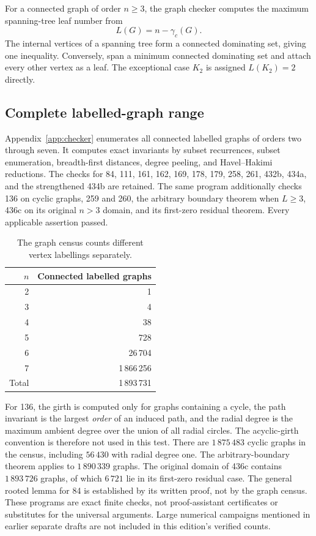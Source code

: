 \documentclass[11pt,a4paper]{article}
\theoremstyle{remark}
\begin{document}
For a connected graph of order $n\ge3$, the graph checker computes the
maximum spanning-tree leaf number from
\begin{equation}\label{eq:cds}
L(G)=n-\gamma_c(G).
\end{equation}
The internal vertices of a spanning tree form a connected dominating set,
giving one inequality. Conversely, span a minimum connected dominating
set and attach every other vertex as a leaf. The exceptional case $K_2$
is assigned $L(K_2)=2$ directly.

\subsection{Complete labelled-graph range}
Appendix~\ref{app:checker} enumerates all connected labelled graphs of orders
two through seven. It computes exact invariants by subset recurrences,
subset enumeration, breadth-first distances, degree peeling, and
Havel--Hakimi reductions. The checks for 84, 111, 161, 162, 169, 178, 179,
258, 261, 432b, 434a, and the strengthened 434b are retained. The same
program additionally checks 136 on cyclic graphs, 259 and 260, the arbitrary
boundary theorem when $L\ge3$, 436c on its original $n>3$ domain, and its
first-zero residual theorem. Every applicable assertion passed.

\begin{table}[htbp]\centering
\begin{tabular}{@{}rr@{}}\toprule
$n$ & Connected labelled graphs\\\midrule
2&1\\3&4\\4&38\\5&728\\6&26\,704\\7&1\,866\,256\\\midrule
Total&1\,893\,731\\\bottomrule
\end{tabular}
\caption{The graph census counts different vertex labellings separately.}
\label{tab:counts}
\end{table}

For 136, the girth is computed only for graphs containing a cycle, the
path invariant is the largest \emph{order} of an induced path, and the
radial degree is the maximum ambient degree over the union of all radial
circles. The acyclic-girth convention is therefore not used in this test.
There are $1\,875\,483$ cyclic graphs in the census, including
$56\,430$ with radial degree one. The arbitrary-boundary theorem applies
to $1\,890\,339$ graphs. The original domain of 436c contains
$1\,893\,726$ graphs, of which $6\,721$ lie in its first-zero residual case.
The general rooted lemma for 84 is established by its written proof,
not by the graph census. These programs are exact finite checks, not
proof-assistant certificates or substitutes for the universal arguments.
Large numerical campaigns mentioned in earlier separate drafts are not
included in this edition's verified counts.
\end{document}
